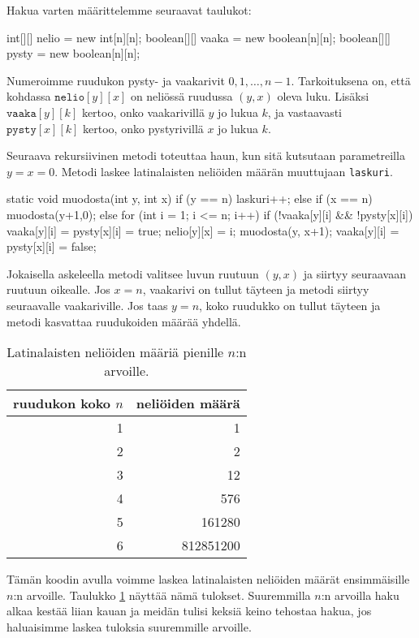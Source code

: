 Hakua varten määrittelemme seuraavat taulukot:

\begin{code}
int[][] nelio = new int[n][n];
boolean[][] vaaka = new boolean[n][n];
boolean[][] pysty = new boolean[n][n];
\end{code}

Numeroimme ruudukon pysty- ja vaakarivit $0,1,\dots,n-1$.
Tarkoituksena on, että kohdassa $\texttt{nelio}[y][x]$
on neliössä ruudussa $(y,x)$ oleva luku.
Lisäksi $\texttt{vaaka}[y][k]$ kertoo, onko vaakarivillä $y$
jo lukua $k$, ja vastaavasti $\texttt{pysty}[x][k]$ kertoo,
onko pystyrivillä $x$ jo lukua $k$.

Seuraava rekursiivinen metodi toteuttaa haun, kun sitä
kutsutaan parametreilla $y=x=0$.
Metodi laskee latinalaisten neliöiden määrän muuttujaan 
\texttt{laskuri}.

\begin{code}
static void muodosta(int y, int x) {
    if (y == n) laskuri++;
    else if (x == n) muodosta(y+1,0);
    else {
        for (int i = 1; i <= n; i++) {
            if (!vaaka[y][i] && !pysty[x][i]) {
                vaaka[y][i] = pysty[x][i] = true;
                nelio[y][x] = i;
                muodosta(y, x+1);
                vaaka[y][i] = pysty[x][i] = false;
            }
        }
    }
}
\end{code}

Jokaisella askeleella metodi valitsee luvun ruutuun
$(y,x)$ ja siirtyy seuraavaan ruutuun oikealle.
Jos $x=n$, vaakarivi on tullut täyteen ja metodi siirtyy
seuraavalle vaakariville.
Jos taas $y=n$, koko ruudukko on tullut täyteen ja
metodi kasvattaa ruudukoiden määrää yhdellä.

\begin{table}
\center
\begin{tabular}{rr}
ruudukon koko $n$ & neliöiden määrä \\
\hline
1 & 1 \\
2 & 2 \\
3 & 12 \\
4 & 576 \\
5 & 161280 \\
6 & 812851200 \\
\end{tabular}
\caption{Latinalaisten neliöiden määriä pienille $n$:n arvoille.}
\label{tab:latnel}
\end{table}

Tämän koodin avulla voimme laskea latinalaisten neliöiden
määrät ensimmäisille $n$:n arvoille.
Taulukko \ref{tab:latnel} näyttää nämä tulokset.
Suuremmilla $n$:n arvoilla haku alkaa kestää liian kauan
ja meidän tulisi keksiä keino tehostaa hakua,
jos haluaisimme laskea tuloksia suuremmille arvoille.

